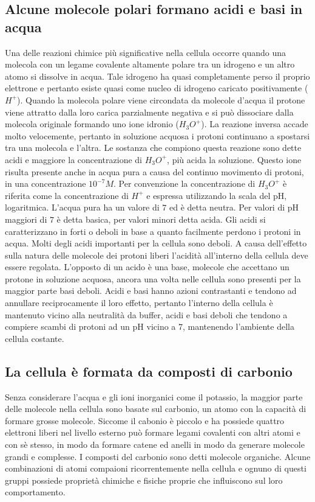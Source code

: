 \subsection{Alcune molecole polari formano acidi e basi in acqua}
Una delle reazioni chimice pi\`u significative nella cellula occorre quando una molecola con un legame covalente altamente polare tra un idrogeno e un altro atomo si dissolve in acqua.
Tale idrogeno ha quasi completamente perso il proprio elettrone e pertanto esiste quasi come nucleo di idrogeno caricato positivamente ($H^+$). Quando la molecola polare viene circondata
da molecole d'acqua il protone viene attratto dalla loro carica parzialmente negativa e si pu\`o dissociare dalla molecola originale formando uno ione idronio ($H_3O^+$). La reazione
inversa accade molto velocemente, pertanto in soluzione acquosa i protoni continuano a spostarsi tra una molecola e l'altra. Le sostanza che compiono questa reazione sono dette acidi e 
maggiore la concentrazione di $H_3O^+$, pi\`u acida la soluzione. Questo ione risulta presente anche in acqua pura a causa del continuo movimento di protoni, in una concentrazione 
$10^{-7} M$. Per convenzione la concentrazione di $H_3O^+$ \`e riferita come la concentrazione di $H^+$ e espressa utilizzando la scala del pH, logaritmica. L'acqua pura ha un valore di 
$7$ ed \`e detta neutra. Per valori di pH maggiori di $7$ \`e detta basica, per valori minori detta acida. Gli acidi si caratterizzano in forti o deboli in base a quanto facilmente 
perdono i protoni in acqua. Molti degli acidi importanti per la cellula sono deboli. A causa dell'effetto sulla natura delle molecole dei protoni liberi l'acidit\`a all'interno della
cellula deve essere regolata. L'opposto di un acido \`e una base, molecole che accettano un protone in soluzione acquosa, ancora una volta nelle cellula sono presenti per la maggior
parte basi deboli. Acidi e basi hanno azioni contrastanti e tendono ad annullare reciprocamente il loro effetto, pertanto l'interno della cellula \`e mantenuto vicino alla neutralit\`a 
da buffer, acidi e basi deboli che tendono a compiere scambi di protoni ad un pH vicino a $7$, mantenendo l'ambiente della cellula costante. 
\subsection{La cellula \`e formata da composti di carbonio}
Senza considerare l'acqua e gli ioni inorganici come il potassio, la maggior parte delle molecole nella cellula sono basate sul carbonio, un atomo con la capacit\`a di formare grosse
molecole. Siccome il cabonio \`e piccolo e ha possiede quattro elettroni liberi nel livello esterno pu\`o formare legami covalenti con altri atomi e con s\`e stesso, in modo da formare
catene ed anelli in modo da generare molecole grandi e complesse. I composti del carbonio sono detti molecole organiche. Alcune combinazioni di atomi compaioni ricorrentemente nella
cellula e ognuno di questi gruppi possiede propriet\`a chimiche e fisiche proprie che influiscono sul loro comportamento. 
